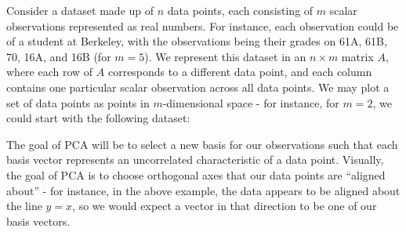 \documentclass[letterpaper]{article}
\theoremstyle{remark}
\begin{document}
Consider a dataset made up of $n$ data points, each consisting of $m$ scalar observations represented as real numbers. For instance, each observation could be of a student at Berkeley, with the observations being their grades on 61A, 61B, 70, 16A, and 16B (for $m = 5$). We represent this dataset in an $n \times m$ matrix $A$, where each row of $A$ corresponds to a different data point, and each column contains one particular scalar observation across all data points. We may plot a set of data points as points in $m$-dimensional space - for instance, for $m=2$, we could start with the following dataset:
\begin{center}
\end{center}

The goal of PCA will be to select a new basis for our observations such that each basis vector represents an uncorrelated characteristic of a data point. Visually, the goal of PCA is to choose orthogonal axes that our data points are ``aligned about'' - for instance, in the above example, the data appears to be aligned about the line $y = x$, so we would expect a vector in that direction to be one of our basis vectors.
\end{document}
